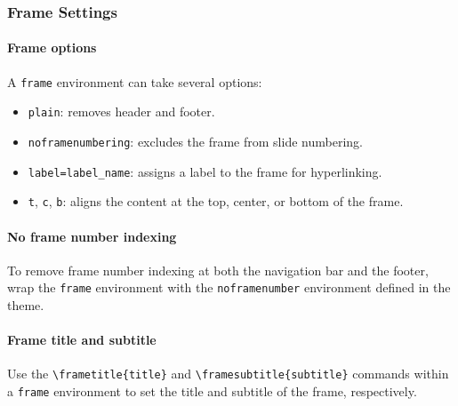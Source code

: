 \begin{frame}
  \frametitle{Frame Settings}

  \paragraph{Frame options}
  A \Verb|frame| environment can take several options:
  \begin{itemize}
    \item \Verb|plain|: removes header and footer.
    \item \Verb|noframenumbering|: excludes the frame from slide numbering.
    \item \Verb|label=label_name|: assigns a label to the frame for hyperlinking.
    \item \Verb|t|, \Verb|c|, \Verb|b|: aligns the content at the top, center, or bottom of the frame.
  \end{itemize}
  
  \paragraph{No frame number indexing}
  To remove frame number indexing at both the navigation bar and the footer, wrap the \Verb|frame| environment with the \Verb|noframenumber| environment defined in the theme.

  \paragraph{Frame title and subtitle}
  Use the \Verb|\frametitle{title}| and \Verb|\framesubtitle{subtitle}| commands within a \Verb|frame| environment to set the title and subtitle of the frame, respectively.

\end{frame}

